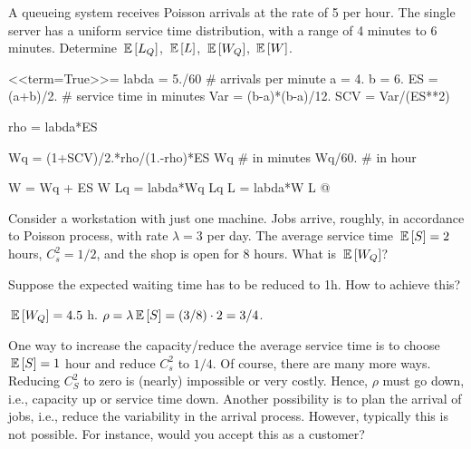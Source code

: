 \begin{question}
  A queueing system receives Poisson arrivals at the rate of 5 per
  hour. The single server has a uniform service time distribution,
  with a range of 4 minutes to 6 minutes. Determine $\,\mathbb{E}\left[L_Q\right]$, $\,\mathbb{E}\left[L\right]$,
  $\,\mathbb{E}\left[W_Q\right]$, $\,\mathbb{E}\left[W\right]$.
  \begin{solution}

<<term=True>>=
labda = 5./60 # arrivals per minute
a = 4.
b = 6.
ES = (a+b)/2.  # service time in minutes
Var = (b-a)*(b-a)/12.
SCV = Var/(ES**2)

rho = labda*ES

Wq = (1+SCV)/2.*rho/(1.-rho)*ES
Wq # in minutes
Wq/60. # in hour


W = Wq + ES
W
Lq = labda*Wq
Lq
L = labda*W
L
@ 
  \end{solution}
\end{question}



\begin{question}
  Consider a workstation with just one machine. Jobs arrive, roughly,
  in accordance to Poisson process, with rate $\lambda=3$ per day. The
  average service time $\,\mathbb{E}\left[S\right] = 2$ hours, $C^2_s = 1/2$, and the shop
  is open for 8 hours. What is $\,\mathbb{E}\left[W_Q\right]$?

 Suppose the expected waiting time has to be reduced to 1h. How
  to achieve this? 
\begin{solution}
  $\,\mathbb{E}\left[W_Q\right] = 4.5$ h. $\rho = \lambda \,\mathbb{E}\left[S\right] = (3/8)\cdot 2 = 3/4$.

 One way to increase the capacity/reduce the average service
    time is to choose $\,\mathbb{E}\left[S\right] =1$ hour and reduce $C^2_s$ to $1/4$.  Of
    course, there are many more ways. Reducing $C^2_S$ to zero is
    (nearly) impossible or very costly. Hence, $\rho$ must go down,
    i.e., capacity up or service time down. Another possibility is to
    plan the arrival of jobs, i.e., reduce the variability in the
    arrival process. However, typically this is not possible. For
    instance, would you accept this as a customer?
\end{solution}

\end{question}


